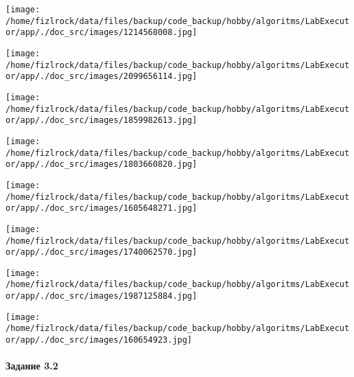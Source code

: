 \documentclass[a4paper, 12pt]{article}
\begin{document}
\texttt{[image: /home/fizlrock/data/files/backup/code\_backup/hobby/algoritms/LabExecutor/app/./doc\_src/images/1214568008.jpg]}

\texttt{[image: /home/fizlrock/data/files/backup/code\_backup/hobby/algoritms/LabExecutor/app/./doc\_src/images/2099656114.jpg]}

\texttt{[image: /home/fizlrock/data/files/backup/code\_backup/hobby/algoritms/LabExecutor/app/./doc\_src/images/1859982613.jpg]}

\texttt{[image: /home/fizlrock/data/files/backup/code\_backup/hobby/algoritms/LabExecutor/app/./doc\_src/images/1803660820.jpg]}

\texttt{[image: /home/fizlrock/data/files/backup/code\_backup/hobby/algoritms/LabExecutor/app/./doc\_src/images/1605648271.jpg]}

\texttt{[image: /home/fizlrock/data/files/backup/code\_backup/hobby/algoritms/LabExecutor/app/./doc\_src/images/1740062570.jpg]}

\texttt{[image: /home/fizlrock/data/files/backup/code\_backup/hobby/algoritms/LabExecutor/app/./doc\_src/images/1987125884.jpg]}

\texttt{[image: /home/fizlrock/data/files/backup/code\_backup/hobby/algoritms/LabExecutor/app/./doc\_src/images/160654923.jpg]}
\pagebreak

\paragraph{Задание 3.2}
\end{document}
